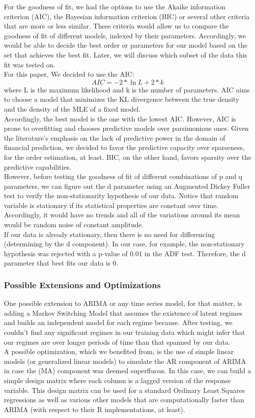 For the goodness of fit, we had the options to use the Akaike information criterion (AIC), the Bayesian information criterion (BIC) or several other criteria that are more or less similar. These criteria would allow us to compare the goodness of fit of different models, indexed by their parameters. Accordingly, we would be able to decide the best order or parameters for our model based on the set that achieves the best fit. Later, we will discuss which subset of the data this fit was tested on.\\
For this paper, We decided to use the AIC: $$AIC = -2*\ln{L} + 2*k$$ where L is the maximum likelihood and k is the number of parameters. AIC aims to choose a model that minimizes the KL divergence between the true density and the density of the MLE of a fixed model.\\
Accordingly, the best model is the one with the lowest AIC. However, AIC is prone to overfitting and chooses predictive models over parsimonious ones. Given the literature's emphasis on the lack of predictive power in the domain of financial prediction, we decided to favor the predictive capacity over sparseness, for the order estimation, at least. BIC, on the other hand, favors sparsity over the predictive capabilities. \\
However, before testing the goodness of fit of different combinations of p and q parameters, we can figure out the d parameter using an Augmented Dickey Fuller test to verify the non-stationarity hypothesis of our data. Notice that random variable is stationary if its statistical properties are constant over time. Accordingly, it would have no trends and all of the variations around its mean would be random noise of constant amplitude. \cite{tsay, VAR}\\
If our data is already stationary, then there is no need for differencing (determining by the d component). In our case, for example, the non-stationary hypothesis was rejected with a p-value of 0.01 in the ADF test. Therefore, the d parameter that best fits our data is 0. \\
\subsubsection{Possible Extensions and Optimizations}
One possible extension to ARIMA or any time series model, for that matter, is adding a Markov Switching Model that assumes the existence of latent regimes and builds an independent model for each regime because.\cite{MS} After testing, we couldn't find any significant regimes in our training data which might infer that our regimes are over longer periods of time than that spanned by our data.\\
A possible optimization, which we benefited from, is the use of simple linear models (or generalized linear models) to simulate the AR component of ARIMA in case the (MA) component was deemed superfluous. In this case, we can build a simple design matrix where each column is a lagged version of the response variable. This design matrix can be used for a standard Ordinary Least Squares regressions as well as various other models that are computationally faster than ARIMA (with respect to their R implementations, at least).\\
